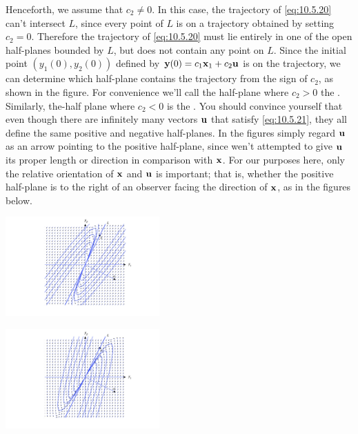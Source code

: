 \documentclass{ximera}
\begin{document}
Henceforth, we assume that $c_2\neq0$. In this case, the trajectory of
\eqref{eq:10.5.20} can't intersect $L$, since every point of $L$ is on a
trajectory obtained by setting $c_2=0$. Therefore the trajectory of
\eqref{eq:10.5.20} must lie entirely in one of the open half-planes
bounded
by $L$, but does not contain any point on $L$. Since the initial point
$(y_1(0),y_2(0))$ defined by ${\bf y}(0)=c_1{\bf x}_1+c_2{\bf u}$ is
on the trajectory, we can determine which half-plane contains the
trajectory from the sign of $c_2$, as shown in
the figure.
For convenience we'll call the half-plane where $c_2>0$ the
. Similarly, the-half plane where $c_2<0$ is
the . You should convince yourself %
that even though there are infinitely
many vectors ${\bf u}$ that satisfy \eqref{eq:10.5.21}, they all define
the same positive and negative half-planes. In the figures simply
regard ${\bf u}$ as an arrow pointing to the positive half-plane,
since wen't attempted to give ${\bf u}$ its proper length or
direction in comparison with ${\bf x}$. For our purposes here, only the
relative orientation of ${\bf x}$ and ${\bf u}$ is important; that is,
whether the positive half-plane is to the right of an observer facing
the direction of ${\bf x}$, as in the figures below.

\begin{image}
 \includegraphics[height=1.5in]{fig100502.jpg} 
\end{image}

\begin{image}
 \includegraphics[height=1.5in]{fig100505.jpg} 
\end{image}
\end{document}
